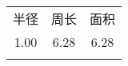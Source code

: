 \documentclass[nofonts]{ctexart}
\begin{document}
\begin{tabular}{|c||cc|}
	\hhline{|=:t:==|}
	半径	& 周长	& 面积	\\
	\hhline{|=::==|}
	1.00	& 6.28	& 6.28	\\
	\hhline{|=:b:==|}
\end{tabular}
\end{document}
